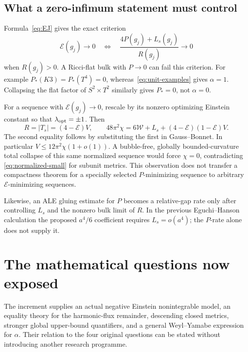 \documentclass[11pt]{article}
\newcommand{\cE}{\mathcal E}
\theoremstyle{definition}
\theoremstyle{remark}
\begin{document}
\subsection{What a zero-infimum statement must control}

Formula~\eqref{eq:EJ} gives the exact criterion
\[
 \cE(g_j)\to0\quad\Longleftrightarrow\quad
 \frac{4P(g_j)+L_s(g_j)}{R(g_j)}\to0
\]
when $R(g_j)>0$. A Ricci-flat bulk with $P\to0$ can fail this criterion.
For example $P_*(K3)=P_*(T^4)=0$, whereas~\eqref{eq:unit-examples}
gives $\alpha=1$. Collapsing the flat factor of
$S^2\times T^2$ similarly gives $P_*=0$, not $\alpha=0$.

For a sequence with $\cE(g_j)\to0$, rescale by its nonzero optimizing
Einstein constant so that $\lambda_{\rm opt}=\pm1$. Then
\begin{equation}
 R=|T_s|=(4-\cE)V,
 \qquad
 48\pi^2\chi=6\mathcal W+L_s+(4-\cE)(1-\cE)V.
 \label{eq:normalized-small}
\end{equation}
The second equality follows by substituting the first in Gauss--Bonnet.
In particular $V\le12\pi^2\chi(1+o(1))$.
A bubble-free, globally bounded-curvature total collapse of this same
normalized sequence would force $\chi=0$, contradicting
\eqref{eq:normalized-small} for subunit metrics. This observation does
not transfer a compactness theorem for a specially selected
$P$-minimizing sequence to arbitrary $\cE$-minimizing sequences.

Likewise, an ALE gluing estimate for $P$ becomes a relative-gap rate only
after controlling $L_s$ and the nonzero bulk limit of $R$. In the
previous Eguchi--Hanson calculation the proposed $a^4/6$ coefficient
requires $L_s=o(a^4)$; the $P$-rate alone does not supply it.

\section{The mathematical questions now exposed}
\label{sec:questions}

The increment supplies an actual negative Einstein nonintegrable model,
an equality theory for the harmonic-flux remainder, descending closed
metrics, stronger global upper-bound quantifiers, and a general
Weyl--Yamabe expression for $\alpha$. Their relation to the four original
questions can be stated without introducing another research programme.
\end{document}
